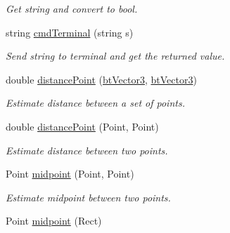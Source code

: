 \begin{DoxyCompactItemize}
\begin{DoxyCompactList}\small\item\em Get string and convert to bool. \end{DoxyCompactList}\item 
\hypertarget{namespacecommon_a5899229353a9bcf1570191eb9acea137}{string \hyperlink{namespacecommon_a5899229353a9bcf1570191eb9acea137}{cmd\-Terminal} (string s)}\label{namespacecommon_a5899229353a9bcf1570191eb9acea137}

\begin{DoxyCompactList}\small\item\em Send string to terminal and get the returned value. \end{DoxyCompactList}\item 
\hypertarget{namespacecommon_ac8769b01d13707ef6598888005e643e9}{double \hyperlink{namespacecommon_ac8769b01d13707ef6598888005e643e9}{distance\-Point} (\hyperlink{structcommon_1_1btVector3}{bt\-Vector3}, \hyperlink{structcommon_1_1btVector3}{bt\-Vector3})}\label{namespacecommon_ac8769b01d13707ef6598888005e643e9}

\begin{DoxyCompactList}\small\item\em Estimate distance between a set of points. \end{DoxyCompactList}\item 
\hypertarget{namespacecommon_a0319cc29ee430ecb0ca77d0f95cdc309}{double \hyperlink{namespacecommon_a0319cc29ee430ecb0ca77d0f95cdc309}{distance\-Point} (Point, Point)}\label{namespacecommon_a0319cc29ee430ecb0ca77d0f95cdc309}

\begin{DoxyCompactList}\small\item\em Estimate distance between two points. \end{DoxyCompactList}\item 
\hypertarget{namespacecommon_a2968370f29c08892258794b87bac33fb}{Point \hyperlink{namespacecommon_a2968370f29c08892258794b87bac33fb}{midpoint} (Point, Point)}\label{namespacecommon_a2968370f29c08892258794b87bac33fb}

\begin{DoxyCompactList}\small\item\em Estimate midpoint between two points. \end{DoxyCompactList}\item 
\hypertarget{namespacecommon_a820e29c932b1f0b6a865772239beeb57}{Point \hyperlink{namespacecommon_a820e29c932b1f0b6a865772239beeb57}{midpoint} (Rect)}\label{namespacecommon_a820e29c932b1f0b6a865772239beeb57}


\end{DoxyCompactItemize}
